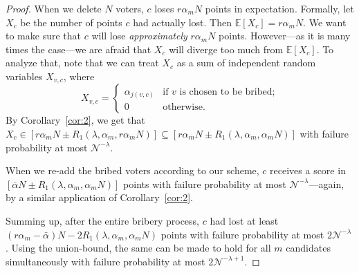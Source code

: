 \documentclass[letterpaper]{article} %
\theoremstyle{definition}
\newcommand{\NN}{\mathcal{N}}
\newcommand{\EE}{\mathbb{E}}
\begin{document}
\begin{proof}
	When we delete $N$ voters, $c$ loses $r \alpha_m N$ points in expectation. Formally, let $X_c$ be the number of points $c$ had actually lost. Then $\EE[X_c] = r\alpha_m N $. We want to make sure that $c$ will lose \emph{approximately} $r\alpha_m N$ points.
	However---as it is many times the case---we are afraid that $X_c$ will diverge too much from $\EE[X_c]$. To analyze that, note that we can treat $X_c$ as a sum of independent random variables $X_{v,c}$, where 
	\begin{equation*}
	X_{v,c} = 
	\begin{cases}
	\alpha_{j(v,c)} & \text{if $v$ is chosen to be bribed;} \\
	0 & \text{otherwise.} 
	\end{cases}
	\end{equation*}	
	By Corollary~\ref{cor:2}, we get that $X_c \in [r\alpha_mN \pm R_1(\lambda, \alpha_{m}, r\alpha_m N) ] \subseteq [r\alpha_mN \pm R_1(\lambda, \alpha_{m}, \alpha_m N)]$ with failure probability at most $\NN^{-\lambda}$. 
	
	
	When we re-add the bribed voters according to our scheme, $c$ receives a score in $[\bar{\alpha} N \pm R_1(\lambda, \alpha_{m}, \alpha_m N)]$ points with failure probability at most $\NN^{-\lambda}$---again, by a similar application of Corollary~\ref{cor:2}. 
	
Summing up, after the entire bribery process, $c$ had lost at least $(r\alpha_m - \bar{\alpha})N-2R_1(\lambda, \alpha_{m}, \alpha_m N)$ points with failure probability at most $2\NN^{-\lambda}$. Using the union-bound, the same can be made to hold for all $m$ candidates simultaneously with failure probability at most $2\NN^{-\lambda+1}$.
	
	
	

\end{proof}
\end{document}

